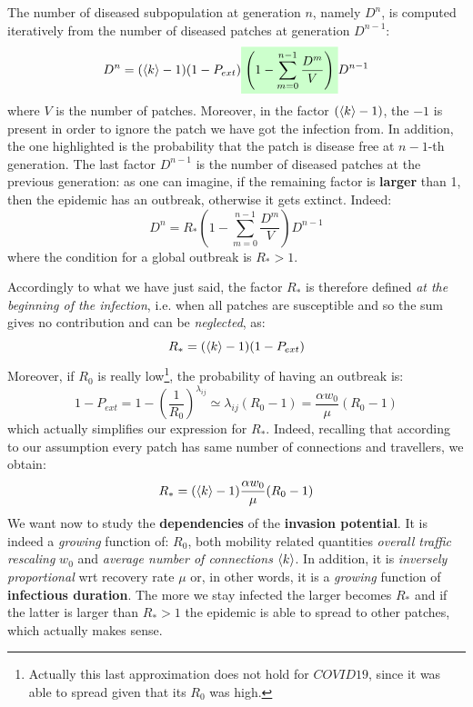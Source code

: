 \documentclass[../main/main.tex]{subfiles}
\begin{document}
The number of diseased subpopulation at generation $n$, namely $D^n$, is computed iteratively from the number of diseased patches at generation $D^{n-1}$:
\begin{equation}
    D^n = (\expval{k}-1)(1-P_{ext}) \mathcolorbox{green!20}{\left( 1- \sum_{m=0}^{n-1} \frac{D^m}{V} \right) } D^{n-1}
    \label{eqn:D^n_first}
\end{equation}
where $V$ is the number of patches. Moreover, in the factor $(\expval{k} - 1)$, the $-1$ is present in order to ignore the patch we have got the infection from. In addition, the one highlighted is the probability that the patch is disease free at $n-1$-th generation. The last factor $D^{n-1}$ is the number of diseased patches at the previous generation: as one can imagine, if the remaining factor is \textbf{larger} than 1, then the epidemic has an outbreak, otherwise it gets extinct. Indeed:
\begin{equation*}
    D^n = R_* \left( 1 - \sum_{m=0}^{n-1} \frac{D^m}{V} \right) D^{n-1}
\end{equation*}
where the condition for a global outbreak is $R_* > 1$. 

Accordingly to what we have just said, the factor $R_*$ is therefore defined \textit{at the beginning of the infection}, i.e. when all patches are susceptible and so the sum gives no contribution and can be \textit{neglected}, as:
\begin{equation}
    R_* = (\expval{k}-1)(1-P_{ext})
\end{equation}
Moreover, if $R_0$ is really low\footnote{Actually this last approximation does not hold for $COVID19$, since it was able to spread given that its $R_0$ was high.}, the probability of having an outbreak is:
\begin{equation}
    1 - P_{ext} = 1 - \left(\frac{1}{R_0} \right) ^{\lambda_{ij}} \simeq \lambda_{ij} (R_0 - 1) = \frac{\alpha w_0}{\mu} (R_0 - 1)
\end{equation}
which actually simplifies our expression for $R_*$. Indeed, recalling that according to our assumption every patch has same number of connections and travellers, we obtain:
\begin{equation}
    R_* = (\expval{k}-1)\frac{\alpha w_0}{\mu} (R_0 - 1)
\end{equation}
We want now to study the \textbf{dependencies} of the \textbf{invasion potential}. It is indeed a \textit{growing} function of: $R_0$, both mobility related quantities \textit{overall traffic rescaling} $w_0$ and \textit{average number of connections} $\expval{k}$. In addition, it is \textit{inversely proportional} wrt recovery rate $\mu$ or, in other words, it is a \textit{growing} function of \textbf{infectious duration}. The more we stay infected the larger becomes $R_*$ and if the latter is larger than $R_* > 1$ the epidemic is able to spread to other patches, which actually makes sense.
\end{document}
